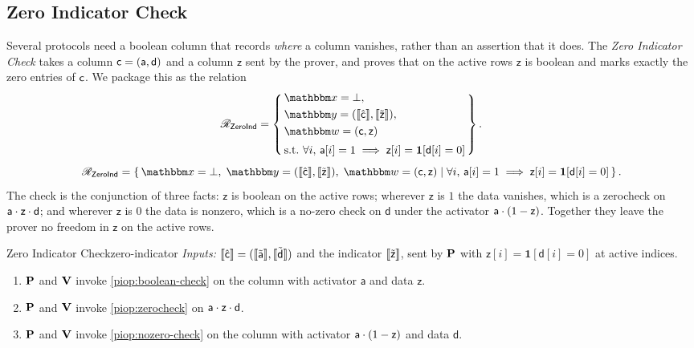 \subsection{Zero Indicator Check}
\label{sec:zero-indicator}
Several protocols need a boolean column that records \emph{where} a column vanishes, rather than an assertion that it does. The \emph{Zero Indicator Check} takes a column $\mathsf{c} = (\mathsf{a},\mathsf{d})$ and a column $\mathsf{z}$ sent by the prover, and proves that on the active rows $\mathsf{z}$ is boolean and marks exactly the zero entries of $\mathsf{c}$. We package this as the relation
\ifsp
\begin{displaymath}
\NPRelation_{\mathsf{ZeroInd}} = \left\{\,
  \begin{aligned}
    & \NPInstance = \bot,\\
    & \NPInstancey = (\Oracle{\hat{\col}}, \Oracle{\MLE{\mathsf{z}}}),\\
    & \NPWitness = (\col, \mathsf{z})\\[2pt]
    & \text{s.t.}\ \forall i,\, \mathsf{a}[i] = 1 \implies \mathsf{z}[i] = \mathbf{1}[\mathsf{d}[i] = 0]
  \end{aligned}
\,\right\}.
\end{displaymath}
\else
\begin{displaymath}
\NPRelation_{\mathsf{ZeroInd}} = \left\{\,
  \NPInstance = \bot,\;
  \NPInstancey = (\Oracle{\hat{\col}}, \Oracle{\MLE{\mathsf{z}}}),\;
  \NPWitness = (\col, \mathsf{z})
  \;\middle|\;
    \forall i,\, \mathsf{a}[i] = 1 \implies \mathsf{z}[i] = \mathbf{1}[\mathsf{d}[i] = 0]
\,\right\}.
\end{displaymath}
\fi
The check is the conjunction of three facts: $\mathsf{z}$ is boolean on the active rows; wherever $\mathsf{z}$ is $1$ the data vanishes, which is a zerocheck on $\mathsf{a}\cdot\mathsf{z}\cdot\mathsf{d}$; and wherever $\mathsf{z}$ is $0$ the data is nonzero, which is a no-zero check on $\mathsf{d}$ under the activator $\mathsf{a}\cdot(1-\mathsf{z})$. Together they leave the prover no freedom in $\mathsf{z}$ on the active rows.
\begin{DefinePIOP}{Zero Indicator Check}{zero-indicator}
  \emph{Inputs:} $\llbracket\hat{\mathsf{c}}\rrbracket = (\llbracket\tilde{\mathsf{a}}\rrbracket, \llbracket\tilde{\mathsf{d}}\rrbracket)$ and the indicator $\llbracket\tilde{\mathsf{z}}\rrbracket$, sent by $\bf{P}$ with $\mathsf{z}[i] = \mathbf{1}[\mathsf{d}[i] = 0]$ at active indices.
  \begin{enumerate}[nosep]
    \item $\bf{P}$ and $\bf{V}$ invoke \cref{piop:boolean-check} on the column with activator $\mathsf{a}$ and data $\mathsf{z}$.
    \item $\bf{P}$ and $\bf{V}$ invoke \cref{piop:zerocheck} on $\mathsf{a}\cdot\mathsf{z}\cdot\mathsf{d}$.
    \item $\bf{P}$ and $\bf{V}$ invoke \cref{piop:nozero-check} on the column with activator $\mathsf{a}\cdot(1-\mathsf{z})$ and data $\mathsf{d}$.
  \end{enumerate}
\end{DefinePIOP}

